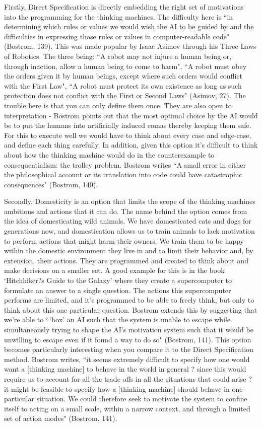 \documentclass[11pt, oneside]{article}
\begin{document}
\par Firstly, Direct Specification is directly embedding the right set of motivations into the programming for the thinking machines. The difficulty here is ``in determining which rules or values we would wish the AI to be guided by and the difficulties in expressing those rules or values in computer-readable code" (Bostrom, 139). This was made popular by Isaac Asimov through his Three Laws of Robotics. The three being: ``A robot may not injure a human being or, through inaction, allow a human being to come to harm", ``A robot must obey the orders given it by human beings, except where such orders would conflict with the First Law", ``A robot must protect its own existence as long as such protection does not conflict with the First or Second Laws" (Asimov, 27). The trouble here is that you can only define them once. They are also open to interpretation - Bostrom points out that the most optimal choice by the AI would be to put the humans into artificially induced comas thereby keeping them safe. For this to execute well we would have to think about every case and edge-case, and define each thing carefully. In addition, given this option it's difficult to think about how the thinking machine would do in the counterexample to consequentialism: the trolley problem. Bostrom writes ``A small error in either the philosophical account or its translation into code could have catastrophic consequences" (Bostrom, 140). 

\par Secondly, Domesticity is an option that limits the scope of the thinking machines ambitions and actions that it can do. The name behind the option comes from the idea of domesticating wild animals. We have domesticated cats and dogs for generations now, and domestication allows us to train animals to lack motivation to perform actions that might harm their owners. We train them to be happy within the domestic environment they live in and to limit their behavior and, by extension, their actions. They are programmed and created to think about and make decisions on a smaller set. A good example for this is in the book `Hitchhiker?s Guide to the Galaxy' where they create a supercomputer to formulate an answer to a single question. The actions this supercomputer performs are limited, and it's programmed to be able to freely think, but only to think about this one particular question. Bostrom extends this by suggesting that we're able to ```box' an AI such that the system is unable to escape while simultaneously trying to shape the AI's motivation system such that it would be unwilling to escape even if it found a way to do so" (Bostrom, 141). This option becomes particularly interesting when you compare it to the Direct Specification method. Bostrom writes, ``it seems extremely difficult to specify how one would want a [thinking machine] to behave in the world in general ? since this would require us to account for all the trade offs in all the situations that could arise ? it might be feasible to specify how a [thinking machine] should behave in one particular situation. We could therefore seek to motivate the system to confine itself to acting on a small scale, within a narrow context, and through a limited set of action modes" (Bostrom, 141). 
\end{document}

